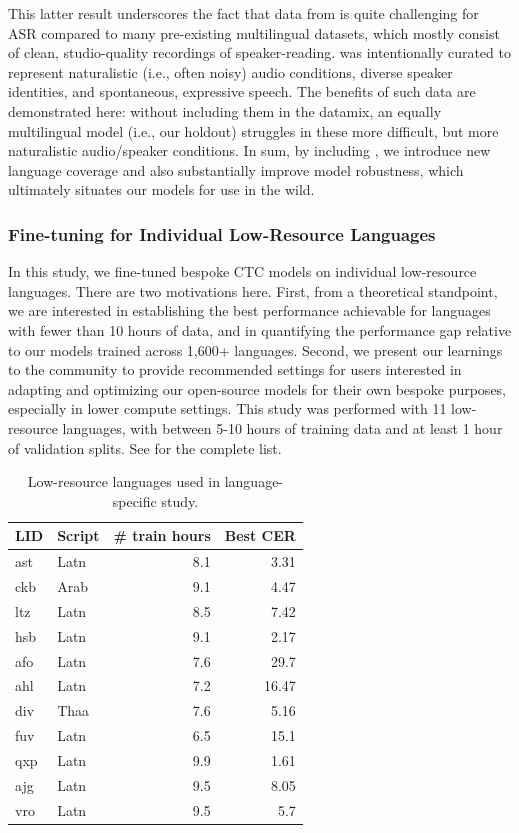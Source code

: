 This latter result underscores the fact that data from \vendoromsf is quite challenging for ASR compared to many pre-existing multilingual datasets, which mostly consist of clean, studio-quality recordings of speaker-reading. \vendoromsf was intentionally curated to represent naturalistic (i.e., often noisy) audio conditions, diverse speaker identities, and spontaneous, expressive speech. The benefits of such data are demonstrated here: without including them in the datamix, an equally multilingual model (i.e., our holdout) struggles in these more difficult, but more naturalistic audio/speaker conditions. In sum, by including \vendoromsf, we introduce new language coverage and also substantially improve model robustness, which ultimately situates our models for use in the wild.

\subsubsection{Fine-tuning for Individual Low-Resource Languages}
\label{sec:language_specific_ablations}

In this study, we fine-tuned bespoke CTC models on individual low-resource languages. There are two motivations here. First, from a theoretical standpoint, we are interested in establishing the best performance achievable for languages with fewer than 10 hours of data, and in quantifying the performance gap relative to our \OmniASR{} models trained across 1,600+ languages. Second, we present our learnings to the community to provide recommended settings for users interested in adapting and optimizing our open-source models for their own bespoke purposes, especially in lower compute settings. This study was performed with 11 low-resource languages, with between 5-10 hours of training data and at least 1 hour of validation splits. See  for the complete list.

\begin{table}
    \centering
    \begin{tabular}{llrr}
    \toprule
         LID & Script &  \# train hours& Best CER\\
    \midrule
         ast&Latn& 8.1 & 3.31 \\
         ckb&Arab& 9.1 & 4.47 \\
         ltz&Latn& 8.5 & 7.42 \\
         hsb&Latn& 9.1 & 2.17 \\
         afo&Latn& 7.6 & 29.7 \\
         ahl&Latn& 7.2 & 16.47 \\
         div&Thaa& 7.6 & 5.16 \\
         fuv&Latn& 6.5 & 15.1 \\
         qxp&Latn& 9.9 & 1.61 \\
         ajg&Latn& 9.5 & 8.05 \\
         vro&Latn& 9.5 & 5.7 \\
    \bottomrule
    \end{tabular}
    \caption{Low-resource languages used in language-specific study.}
    \label{tab:low_res_lang_list}
\end{table}

